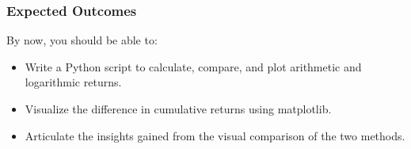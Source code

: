 \documentclass{article}
\begin{document}
\subsubsection{Expected Outcomes}

By now, you should be able to:
\begin{itemize}
    \item Write a Python script to calculate, compare, and plot arithmetic and logarithmic returns.
    \item Visualize the difference in cumulative returns using matplotlib.
    \item Articulate the insights gained from the visual comparison of the two methods.
\end{itemize}
\end{document}
